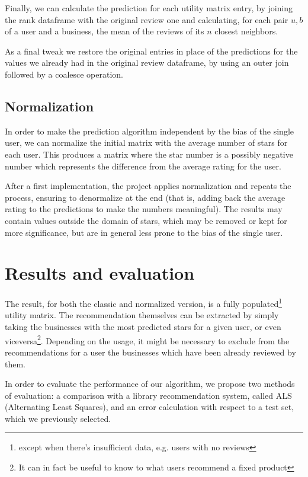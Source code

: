 \documentclass[11pt,a4paper]{article}
\begin{document}
\begin{multicols}{2}
Finally, we can calculate the prediction for each utility matrix entry, by joining the rank dataframe with the original review one and calculating, for each pair $u,b$ of a user and a business, the mean of the reviews of its $n$ closest neighbors.

As a final tweak we restore the original entries in place of the predictions for the values we already had in the original review dataframe, by using an outer join followed by a coalesce operation.


\subsection{Normalization}
In order to make the prediction algorithm independent by the bias of the single user, we can normalize the initial matrix with the average number of stars for each user.
This produces a matrix where the star number is a possibly negative number which represents the difference from the average rating for the user.

After a first implementation, the project applies normalization and repeats the process, ensuring to denormalize at the end (that is, adding back the average rating to the predictions to make the numbers meaningful).
The results may contain values outside the domain of stars, which may be removed or kept for more significance, but are in general less prone to the bias of the single user.


\label{evaluation}
\section{Results and evaluation}
The result, for both the classic and normalized version, is a fully populated\footnote{except when there's insufficient data, e.g. users with no reviews} utility matrix.
The recommendation themselves can be extracted by simply taking the businesses with the most predicted stars for a given user, or even viceversa\footnote{It can in fact be useful to know to what users recommend a fixed product}.
Depending on the usage, it might be necessary to exclude from the recommendations for a user the businesses which have been already reviewed by them.

In order to evaluate the performance of our algorithm, we propose two methods of evaluation: a comparison with a library recommendation system, called ALS (Alternating Least Squares), and an error calculation with respect to a test set, which we previously selected.


\end{multicols}
\end{document}
